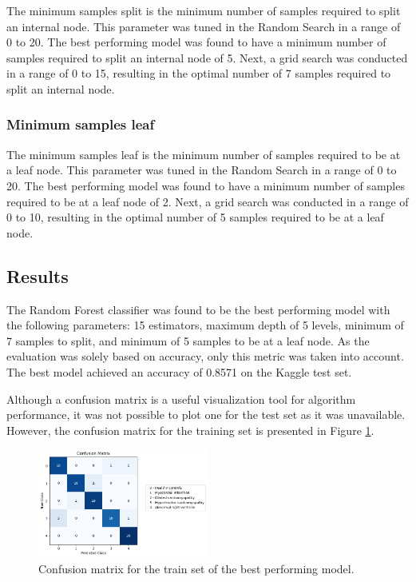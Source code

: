 \documentclass[conference]{IEEEtran}
\begin{document}
            The minimum samples split is the minimum number of samples required to split an internal node.
            This parameter was tuned in the Random Search in a range of 0 to 20. The best performing model was found
            to have a minimum number of samples required to split an internal node of 5. Next, a grid search was 
            conducted in a range of 0 to 15, resulting in the optimal number of 7 samples required to split an 
            internal node.
        
        \subsubsection{Minimum samples leaf}
            
            The minimum samples leaf is the minimum number of samples required to be at a leaf node. This parameter
            was tuned in the Random Search in a range of 0 to 20. The best performing model was found to have a minimum
            number of samples required to be at a leaf node of 2. Next, a grid search was conducted in a range of
            0 to 10, resulting in the optimal number of 5 samples required to be at a leaf node.


\subsection{Results}

    The Random Forest classifier was found to be the best performing model with the following parameters: 15 estimators,
    maximum depth of 5 levels, minimum of 7 samples to split, and minimum of 5 samples to be at a leaf node.
    As the evaluation was solely based on accuracy, only this metric was taken into account. 
    The best model achieved an accuracy of 0.8571 on the Kaggle test set. 
    
    Although a confusion matrix is a useful visualization tool for algorithm performance, 
    it was not possible to plot one for the test set as it was unavailable. 
    However, the confusion matrix for the training set is presented in Figure \ref{fig:confusion_matrix}.


    \begin{figure}
        \centering
        \includegraphics[width=0.5\textwidth]{images/train_cm.png}
        \caption{Confusion matrix for the train set of the best performing model.}
        \label{fig:confusion_matrix}
    \end{figure}
\end{document}

